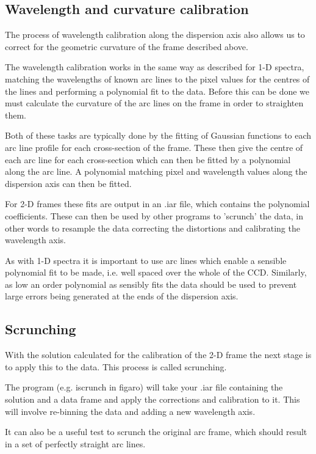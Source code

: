 \documentclass[twoside,11pt]{starlink}
\providecommand{\mlabel}[1]{\xlabel{#1}\label{#1}}
\begin{document}
\subsection{\mlabel{arc_fit}Wavelength and curvature calibration}

The process of wavelength calibration along the dispersion axis also
allows us to correct for the geometric curvature of the frame
described above.

The wavelength calibration works in the same way as described for 1-D
spectra, matching the wavelengths of known arc lines to the pixel
values for the centres of the lines and performing a polynomial fit to
the data. Before this can be done we must calculate the curvature of the arc
lines on the frame in order to straighten them.

Both of these tasks are typically done by the fitting of Gaussian
functions to each arc line profile for each cross-section of the
frame. These then give the centre of each arc line for each
cross-section which can then be fitted by a polynomial along the arc
line. A polynomial matching pixel and wavelength values along the
dispersion axis can then be fitted.

For 2-D frames these fits are output in an .iar file, which contains
the polynomial coefficients. These can then be used by other programs
to 'scrunch' the data, in other words to resample the data correcting
the distortions and calibrating the wavelength axis.

As with 1-D spectra it is important to use arc lines which enable a
sensible polynomial fit to be made, i.e. well spaced over the whole of
the CCD. Similarly, as low an order polynomial as sensibly fits the
data should be used to prevent large errors being generated at the ends
of the dispersion axis.

\subsection{\mlabel{scrunching}Scrunching}

With the solution calculated for the calibration of the 2-D frame the
next stage is to apply this to the data. This process is called
scrunching.

The program (e.g. iscrunch in figaro) will take your .iar file
containing the solution and a data frame and apply the corrections and
calibration to it. This will involve re-binning the data and adding a
new wavelength axis.

It can also be a useful test to scrunch the original arc frame, which
should result in a set of perfectly straight arc lines.
\end{document}
